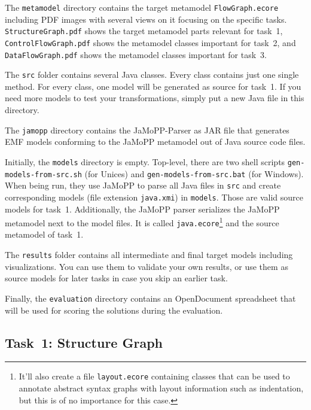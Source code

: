 \documentclass[submission,copyright,creativecommons]{eptcs}
\begin{document}
The \verb|metamodel| directory contains the target metamodel
\verb|FlowGraph.ecore| including PDF images with several views on it focusing
on the specific tasks.  \verb|StructureGraph.pdf| shows the target metamodel
parts relevant for task~1, \verb|ControlFlowGraph.pdf| shows the metamodel
classes important for task~2, and \verb|DataFlowGraph.pdf| shows the metamodel
classes important for task~3.

The \verb|src| folder contains several Java classes.  Every class contains just
one single method.  For every class, one model will be generated as source for
task~1.  If you need more models to test your transformations, simply put a new
Java file in this directory.

The \verb|jamopp| directory contains the JaMoPP-Parser as JAR file that
generates EMF models conforming to the JaMoPP metamodel out of Java source code
files.

Initially, the \verb|models| directory is empty.  Top-level, there are two
shell scripts \verb|gen-models-from-src.sh| (for Unices) and
\verb|gen-models-from-src.bat| (for Windows).  When being run, they use JaMoPP
to parse all Java files in \verb|src| and create corresponding models (file
extension \verb|java.xmi|) in \verb|models|.  Those are valid source models for
task~1.  Additionally, the JaMoPP parser serializes the JaMoPP metamodel next
to the model files.  It is called \verb|java.ecore|\footnote{It'll also create
  a file \texttt{layout.ecore} containing classes that can be used to annotate
  abstract syntax graphs with layout information such as indentation, but this
  is of no importance for this case.} and the source metamodel of task~1.

The \verb|results| folder contains all intermediate and final target models
including visualizations.  You can use them to validate your own results, or
use them as source models for later tasks in case you skip an earlier task.

Finally, the \verb|evaluation| directory contains an OpenDocument spreadsheet
that will be used for scoring the solutions during the evaluation.


\subsection{Task~1: Structure Graph}
\label{sec:task1-structure-graph}
\end{document}
